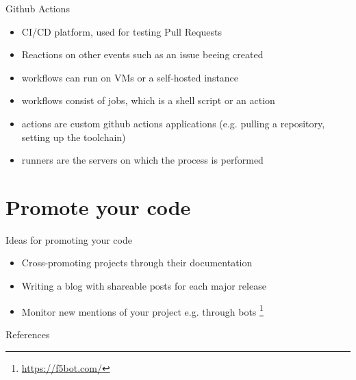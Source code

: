 \documentclass[compress,aspectratio=169]{beamer}
\begin{document}
		\begin{frame}{Github Actions}
			\begin{itemize}
				\item 	CI/CD platform, used for testing Pull Requests
				\item 	Reactions on other events such as an issue beeing created
				\item 	workflows can run on VMs or a self-hosted instance
				\item 	workflows consist of jobs, which is a shell script or an action
				\item 	actions are custom github actions applications (e.g. pulling a repository, setting up the toolchain) 
				\item 	runners are the servers on which the process is performed
			\end{itemize}
		\end{frame}
		
	
	\section{Promote your code}
	
		\begin{frame}{Ideas for promoting your code}
		
			\begin{itemize}
				\item Cross-promoting projects through their documentation
				\item Writing a blog with shareable posts for each major release
				\item Monitor new mentions of your project e.g. through bots \footnote{\url{https://f5bot.com/}}
			\end{itemize}
			
		\end{frame}
	
		
		\begin{frame}{References}
			\renewcommand*{\bibfont}{\normalfont\scriptsize}
			\printbibliography[heading=none]
			\label{pg:lastpage} %
		\end{frame}
\end{document}
